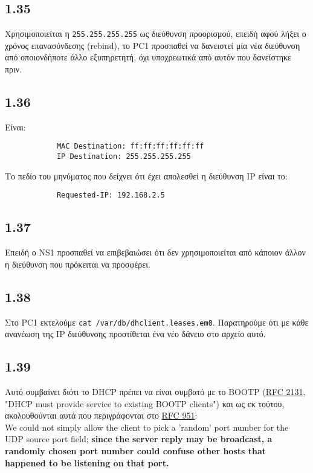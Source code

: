 \documentclass[a4paper, 12pt]{article}
\begin{document}
	\subsection*{1.35}
		Χρησιμοποιείται η \verb|255.255.255.255| ως διεύθυνση προορισμού, επειδή αφού λήξει ο χρόνος επανασύνδεσης (rebind), το PC1 προσπαθεί να δανειστεί μία νέα διεύθυνση από οποιονδήποτε άλλο εξυπηρετητή, όχι υποχρεωτικά από αυτόν που δανείστηκε πριν.
	
	\subsection*{1.36}
		Είναι:
		
		\begin{verbatim}
			MAC Destination: ff:ff:ff:ff:ff:ff
			IP Destination: 255.255.255.255
		\end{verbatim}
		
		Το πεδίο του μηνύματος που δείχνει ότι έχει απολεσθεί η διεύθυνση IP είναι το:
		
		\begin{verbatim}
			Requested-IP: 192.168.2.5
		\end{verbatim}
	
	\subsection*{1.37}
		Επειδή ο NS1 προσπαθεί να επιβεβαιώσει ότι δεν χρησιμοποιείται από κάποιον άλλον η διεύθυνση που πρόκειται να προσφέρει.
	
	\subsection*{1.38}
		Στο PC1 εκτελούμε \verb|cat /var/db/dhclient.leases.em0|. Παρατηρούμε ότι με κάθε ανανέωση της IP διεύθυνσης προστίθεται ένα νέο δάνειο στο αρχείο αυτό.
	
	\subsection*{1.39} 
		Αυτό συμβαίνει διότι το DHCP πρέπει να είναι συμβατό με το BOOTP (\href{https://datatracker.ietf.org/doc/html/rfc2131#section-1.6}{RFC 2131}, "DHCP must provide service to existing BOOTP clients") και ως εκ τούτου, ακολουθούνται αυτά που περιγράφονται στο \href{https://datatracker.ietf.org/doc/html/rfc951#section-3}{RFC 951}: \\
			
			We could not simply allow the client to pick a 'random' port number for the UDP source port field; \textbf{since the server reply may be broadcast, a randomly chosen port number could confuse other hosts that happened to be listening on that port.}
			
\end{document}

